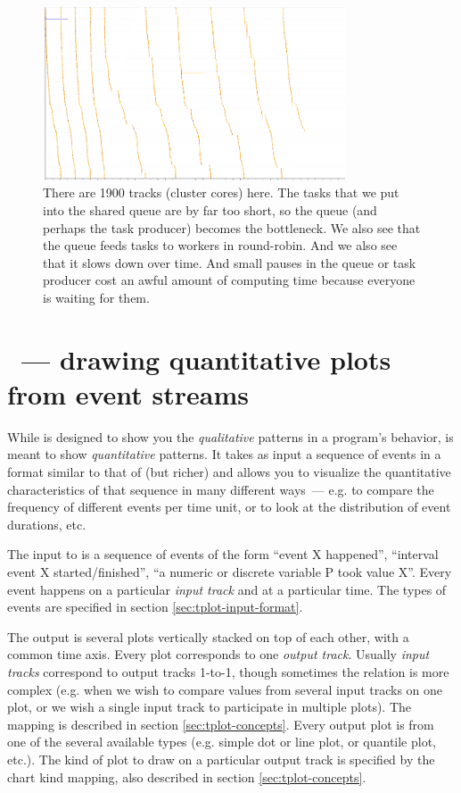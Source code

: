 \documentclass{article}
\begin{document}
\begin{figure}[p]
\center
\includegraphics[width=0.8\textwidth]{pics/splot/spray.png}
\caption{There are 1900 tracks (cluster cores) here. The tasks that we put into the shared queue are by far too short, so the queue (and perhaps the task producer) becomes the bottleneck. We also see that the queue feeds tasks to workers in round-robin. And we also see that it slows down over time. And small pauses in the queue or task producer cost an awful amount of computing time because everyone is waiting for them.}
\label{fig:splot-gallery-last}
\end{figure}

\pagebreak

\section{\timeplot{}~--- drawing quantitative plots from event streams}

While \splot{} is designed to show you the \emph{qualitative} patterns in a program's behavior, \timeplot{} is meant to show \emph{quantitative} patterns. It takes as input a sequence of events in a format similar to that of \splot{} (but richer) and allows you to visualize the quantitative characteristics of that sequence in many different ways~--- e.g. to compare the frequency of different events per time unit, or to look at the distribution of event durations, etc.

The input to \timeplot{} is a sequence of events of the form ``event X happened'', ``interval event X started/finished'', ``a numeric or discrete variable P took value X''. Every event happens on a particular \emph{input track} and at a particular time. The types of events are specified in section \ref{sec:tplot-input-format}.

The output is several plots vertically stacked on top of each other, with a common time axis. Every plot corresponds to one \emph{output track}. Usually \emph{input tracks} correspond to output tracks 1-to-1, though sometimes the relation is more complex (e.g. when we wish to compare values from several input tracks on one plot, or we wish a single input track to participate in multiple plots). The mapping is described in section \ref{sec:tplot-concepts}. Every output plot is from one of the several available types (e.g. simple dot or line plot, or quantile plot, etc.). The kind of plot to draw on a particular output track is specified by the chart kind mapping, also described in section \ref{sec:tplot-concepts}.
\end{document}
